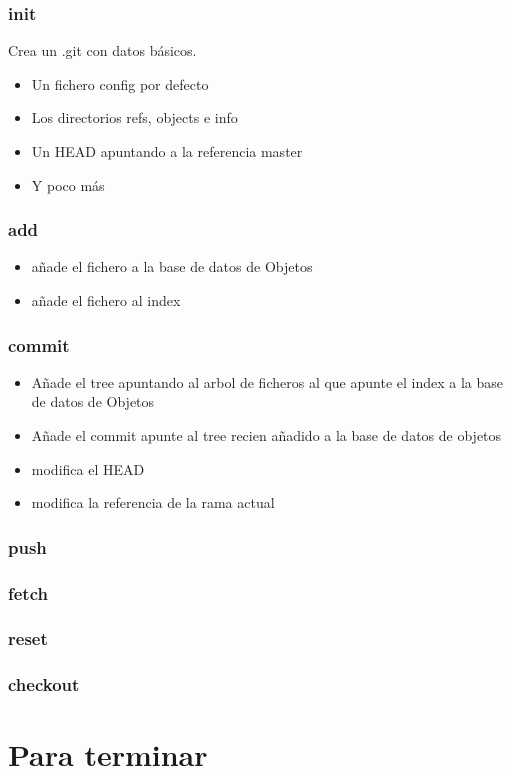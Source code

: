 \documentclass[10pt]{beamer}
\begin{document}
  \begin{frame}
    \frametitle{init}
    Crea un .git con datos básicos.
    \begin{itemize}
      \item Un fichero config por defecto
      \item Los directorios refs, objects e info
      \item Un HEAD apuntando a la referencia master
      \item Y poco más
    \end{itemize}
  \end{frame}

  \begin{frame}
    \frametitle{add}
    \begin{itemize}
      \item añade el fichero a la base de datos de Objetos
      \item añade el fichero al index
    \end{itemize}
  \end{frame}

  \begin{frame}
    \frametitle{commit}
    \begin{itemize}
      \item Añade el tree apuntando al arbol de ficheros al que apunte el index a la base de datos de Objetos
      \item Añade el commit apunte al tree recien añadido a la base de datos de objetos
      \item modifica el HEAD
      \item modifica la referencia de la rama actual
    \end{itemize}
  \end{frame}

  \begin{frame}
    \frametitle{push}
  \end{frame}

  \begin{frame}
    \frametitle{fetch}
  \end{frame}

  \begin{frame}
    \frametitle{reset}
  \end{frame}

  \begin{frame}
    \frametitle{checkout}
  \end{frame}

  \section*{Para terminar}
\end{document}
